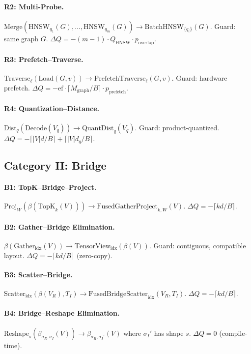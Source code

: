 \documentclass{article}
\theoremstyle{definition}
\theoremstyle{remark}
\newcommand{\ceil}[1]{\lceil #1 \rceil}
\newcommand{\Qhnsw}{Q_{\mathrm{HNSW}}}
\newcommand{\Mgraph}{M_{\mathrm{graph}}}
\begin{document}
\paragraph{R2: Multi-Probe.}
$\mathrm{Merge}(\mathrm{HNSW}_{q_1}(G),\ldots,\mathrm{HNSW}_{q_m}(G)) \to \mathrm{BatchHNSW}_{\{q_i\}}(G)$.
Guard: same graph $G$. $\Delta Q = -(m-1) \cdot \Qhnsw \cdot p_{\text{overlap}}$.

\paragraph{R3: Prefetch--Traverse.}
$\mathrm{Traverse}_\ell(\mathrm{Load}(G,v)) \to \mathrm{PrefetchTraverse}_\ell(G,v)$.
Guard: hardware prefetch. $\Delta Q = -\mathrm{ef} \cdot \ceil{\Mgraph/B} \cdot p_{\text{prefetch}}$.

\paragraph{R4: Quantization--Distance.}
$\mathrm{Dist}_q(\mathrm{Decode}(V_q)) \to \mathrm{QuantDist}_q(V_q)$.
Guard: product-quantized. $\Delta Q = -\ceil{|V|d/B} + \ceil{|V|d_q/B}$.

\subsection{Category II: Bridge}

\paragraph{B1: TopK--Bridge--Project.}
$\mathrm{Proj}_W(\beta(\mathrm{TopK}_k(V))) \to \mathrm{FusedGatherProject}_{k,W}(V)$.
$\Delta Q = -\ceil{kd/B}$.

\paragraph{B2: Gather--Bridge Elimination.}
$\beta(\mathrm{Gather}_{\text{idx}}(V)) \to \mathrm{TensorView}_{\text{idx}}(\beta(V))$.
Guard: contiguous, compatible layout. $\Delta Q = -\ceil{kd/B}$ (zero-copy).

\paragraph{B3: Scatter--Bridge.}
$\mathrm{Scatter}_{\text{idx}}(\beta(V_R), T_I) \to \mathrm{FusedBridgeScatter}_{\text{idx}}(V_R, T_I)$.
$\Delta Q = -\ceil{kd/B}$.

\paragraph{B4: Bridge--Reshape Elimination.}
$\mathrm{Reshape}_s(\beta_{\sigma_R,\sigma_I}(V)) \to \beta_{\sigma_R,\sigma_I'}(V)$ where $\sigma_I'$ has shape $s$.
$\Delta Q = 0$ (compile-time).
\end{document}
